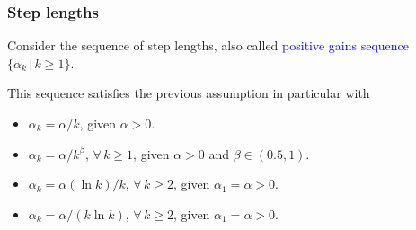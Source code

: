\documentclass{beamer}
\begin{document}
\begin{frame}
\frametitle{Step lengths}

Consider the sequence of step lengths, also called \textcolor{blue}{positive gains sequence} $\{ \alpha_k \,|\, k \geq 1 \}$.

\mbox{}

This sequence satisfies the previous assumption in particular with
\begin{itemize}
\item 
$\alpha_k = \alpha/k$, given $\alpha > 0$.
\item 
$\alpha_k = \alpha/k^{\beta}$, $\forall\, k \geq 1$, given $\alpha > 0$ and $\beta \in (0.5, 1)$.
\item
$\alpha_k = \alpha(\ln k)/k$, $\forall\, k \geq 2$, given $\alpha_1 = \alpha > 0$.
\item
$\alpha_k = \alpha/(k \ln k)$, $\forall\, k \geq 2$, given $\alpha_1 = \alpha > 0$.
\end{itemize}

\end{frame}
\end{document}

